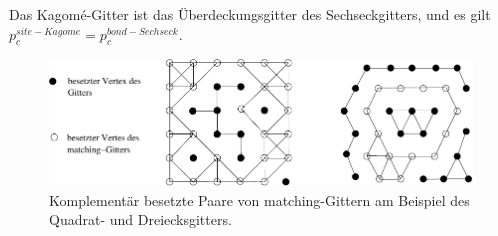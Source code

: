 Das Kagom\'e-Gitter ist das \"Uberdeckungsgitter des Sechseckgitters, und es gilt $p_c^{site-Kagome}=p_c^{bond-Sechseck}$. \\
\begin{figure}[htbp]
  \centering
  \includegraphics{./Einleitung-figs/match}
  \caption{Komplement\"ar besetzte Paare von matching-Gittern am Beispiel des Quadrat- und Dreiecksgitters.}
  \label{fig:matching} 
\end{figure}


